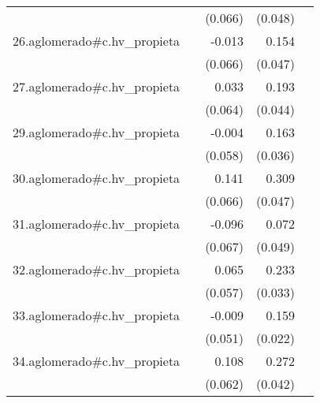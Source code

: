{\begin{longtable}{l*{4}{D{.}{.}{-1}}}
            &                     &     (0.066)         &     (0.048)         &                     \\
\addlinespace
26.aglomerado#c.hv\_propieta&                     &      -0.013         &       0.154\sym{**} &                     \\
            &                     &     (0.066)         &     (0.047)         &                     \\
\addlinespace
27.aglomerado#c.hv\_propieta&                     &       0.033         &       0.193\sym{***}&                     \\
            &                     &     (0.064)         &     (0.044)         &                     \\
\addlinespace
29.aglomerado#c.hv\_propieta&                     &      -0.004         &       0.163\sym{***}&                     \\
            &                     &     (0.058)         &     (0.036)         &                     \\
\addlinespace
30.aglomerado#c.hv\_propieta&                     &       0.141\sym{*}  &       0.309\sym{***}&                     \\
            &                     &     (0.066)         &     (0.047)         &                     \\
\addlinespace
31.aglomerado#c.hv\_propieta&                     &      -0.096         &       0.072         &                     \\
            &                     &     (0.067)         &     (0.049)         &                     \\
\addlinespace
32.aglomerado#c.hv\_propieta&                     &       0.065         &       0.233\sym{***}&                     \\
            &                     &     (0.057)         &     (0.033)         &                     \\
\addlinespace
33.aglomerado#c.hv\_propieta&                     &      -0.009         &       0.159\sym{***}&                     \\
            &                     &     (0.051)         &     (0.022)         &                     \\
\addlinespace
34.aglomerado#c.hv\_propieta&                     &       0.108         &       0.272\sym{***}&                     \\
            &                     &     (0.062)         &     (0.042)         &                     \\

\end{longtable}}
